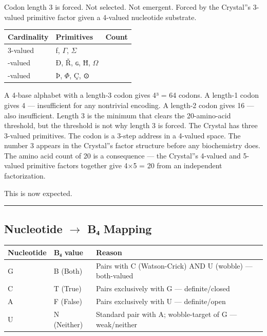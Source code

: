 \documentclass[12pt,a4paper]{article}
\begin{document}
Codon length 3 is forced. Not selected. Not emergent. Forced by the Crystal''s 3-valued primitive factor given a 4-valued nucleotide substrate.

\begin{table}[htbp]
\centering
\small
{}
\begin{tabularx}{\textwidth}{>{\centering\arraybackslash}X >{\centering\arraybackslash}X >{\centering\arraybackslash}X}
\toprule
\rowcolor{gray!25}\textbf{Cardinality} & \textbf{Primitives} & \textbf{Count} \\
\midrule
\rowcolors{1}{white}{gray!10}
3-valued & ƒ, $\Gamma$, $\Sigma$ & 3 \\
4-valued & Ð, Ř, ɢ, Ħ, $\Omega$ & 5 \\
5-valued & Þ, $\Phi$, Ç, ⊙ & 4 \\
\bottomrule
\end{tabularx}
\end{table}

A 4-base alphabet with a length-3 codon gives 4³ = 64 codons. A length-1 codon gives 4 --- insufficient for any nontrivial encoding. A length-2 codon gives 16 --- also insufficient. Length 3 is the minimum that clears the 20-amino-acid threshold, but the threshold is not why length 3 is forced. The Crystal has three 3-valued primitives. The codon is a 3-step address in a 4-valued space. The number 3 appears in the Crystal''s factor structure before any biochemistry does. The amino acid count of 20 is a consequence --- the Crystal''s 4-valued and 5-valued primitive factors together give 4$\times$5 = 20 from an independent factorization.

This is now expected.

\begin{center}
\rule{0.5\textwidth}{0.4pt}
\end{center}

\subsection{Nucleotide $\rightarrow$ B₄ Mapping}

\begin{table}[htbp]
\centering
\small
{}
\begin{tabularx}{\textwidth}{>{\centering\arraybackslash}X >{\centering\arraybackslash}X >{\centering\arraybackslash}X}
\toprule
\rowcolor{gray!25}\textbf{Nucleotide} & \textbf{B₄ value} & \textbf{Reason} \\
\midrule
\rowcolors{1}{white}{gray!10}
G & B (Both) & Pairs with C (Watson-Crick) AND U (wobble) --- both-valued \\
C & T (True) & Pairs exclusively with G --- definite/closed \\
A & F (False) & Pairs exclusively with U --- definite/open \\
U & N (Neither) & Standard pair with A; wobble-target of G --- weak/neither \\
\bottomrule
\end{tabularx}
\end{table}
\end{document}
